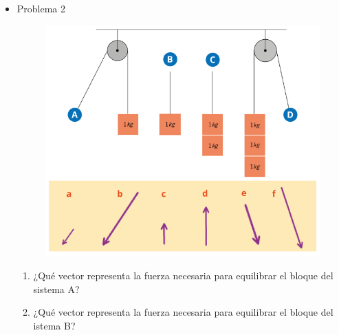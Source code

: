 \documentclass[11pt]{book}
\begin{document}
\begin{itemize}
\begin{boxK}
\begin{minipage}[t]{0.3\linewidth}
\begin{figure}[H]
            \end{figure}
          \end{minipage}
        \end{boxK}

  \item Problema 2
        \begin{boxK}
          \begin{figure}[H]
            \centering
            \includegraphics[width=0.6\linewidth]{poleas01.png}
          \end{figure}
          \footnotesize
          \begin{enumerate}
            \item ¿Qué vector representa la fuerza necesaria para equilibrar el bloque del
                  sistema A?\\
            \item ¿Qué vector representa la fuerza necesaria para equilibrar el bloque del
                  istema B?\\
\end{enumerate}
\end{boxK}
\end{itemize}
\end{document}
